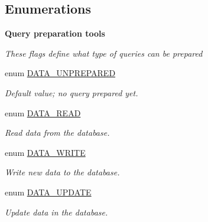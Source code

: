 \subsection*{Enumerations}
\begin{Indent}{\bf Query preparation tools}\par
{\em These flags define what type of queries can be prepared }\begin{CompactItemize}
\item 
enum \hyperlink{class_8datahandler_8php_21c8184f96d445f8f608321e0e8fffc9}{DATA\_\-UNPREPARED} 
\begin{CompactList}\small\item\em Default value; no query prepared yet. \item\end{CompactList}\item 
enum \hyperlink{class_8datahandler_8php_c28f74b49007773d24ca2207baac6d32}{DATA\_\-READ} 
\begin{CompactList}\small\item\em Read data from the database. \item\end{CompactList}\item 
enum \hyperlink{class_8datahandler_8php_5d8b54a2eb4767a05a2e577c2db9193a}{DATA\_\-WRITE} 
\begin{CompactList}\small\item\em Write new data to the database. \item\end{CompactList}\item 
enum \hyperlink{class_8datahandler_8php_9a817a8e9190bfc1eb884f9b4c3cb7c8}{DATA\_\-UPDATE} 
\begin{CompactList}\small\item\em Update data in the database. \item\end{CompactList}\end{CompactItemize}
\end{Indent}

